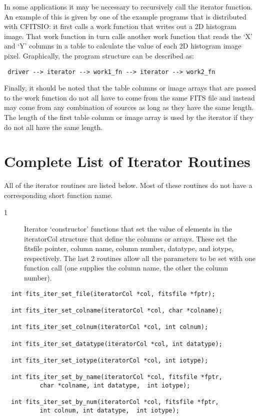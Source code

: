 \documentclass[11pt]{book}
\begin{document}
In some applications it may be necessary to recursively call the iterator
function.  An example of this is given by one of the example programs
that is distributed with CFITSIO: it first calls a work function that
writes out a 2D histogram image.  That work function in turn calls
another work function that reads the  `X' and `Y' columns in a table to
calculate the value of each 2D histogram image pixel. Graphically, the
program structure can be described as:

\begin{verbatim}
 driver --> iterator --> work1_fn --> iterator --> work2_fn
\end{verbatim}

Finally, it should be noted that the table columns or image arrays that
are passed to the work function do not all have to come from the same
FITS file and instead may come from any combination of sources as long
as they have the same length.   The length of the first table column or
image array is used by the iterator if they do not all have the same
length.


\section{Complete List of Iterator Routines}

All of the iterator routines are listed below.  Most of these routines
do not have a corresponding short function name.


\begin{description}
\item[1 ]  Iterator `constructor' functions that set
   the value of elements in the iteratorCol structure
   that define the columns or arrays. These set the fitsfile
    pointer, column name, column number, datatype, and iotype,
    respectively.  The last 2 routines allow all the parameters
    to be set with one function call (one supplies the column
   name, the other the column number). \label{ffiterset}
\end{description}


\begin{verbatim}
  int fits_iter_set_file(iteratorCol *col, fitsfile *fptr);

  int fits_iter_set_colname(iteratorCol *col, char *colname);

  int fits_iter_set_colnum(iteratorCol *col, int colnum);

  int fits_iter_set_datatype(iteratorCol *col, int datatype);

  int fits_iter_set_iotype(iteratorCol *col, int iotype);

  int fits_iter_set_by_name(iteratorCol *col, fitsfile *fptr,
          char *colname, int datatype,  int iotype);

  int fits_iter_set_by_num(iteratorCol *col, fitsfile *fptr,
          int colnum, int datatype,  int iotype);
\end{verbatim}
\end{document}
